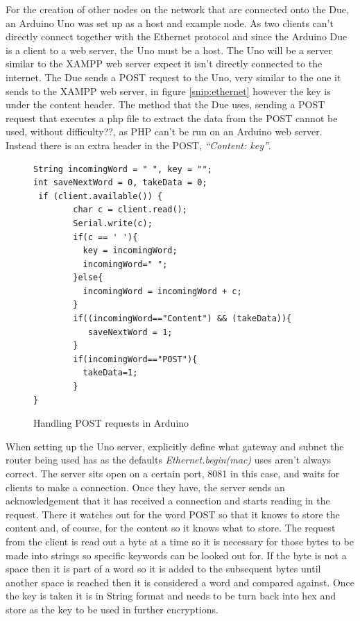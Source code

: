 For the creation of other nodes on the network that are connected onto the Due, an Arduino Uno was set up as a host and example node. As two clients can't directly connect together with the Ethernet protocol and since the Arduino Due is a client to a web server, the Uno must be a host. The Uno will be a server similar to the XAMPP web server expect it isn't directly connected to the internet. 
The Due sends a POST request to the Uno, very similar to the one it sends to the XAMPP web server, in figure \ref{snip:ethernet} however the key is under the content header. The method that the Due uses, sending a POST request that executes a php file to extract the data from the POST cannot be used, without difficulty??, as PHP can't be run on an Arduino web server. Instead there is an extra header in the POST, \emph{``Content: key''}.

\begin{figure}[H]
\begin{lstlisting}[style=Arduino]
String incomingWord = " ", key = "";
int saveNextWord = 0, takeData = 0;
 if (client.available()) {
        char c = client.read();
        Serial.write(c);
        if(c == ' '){
          key = incomingWord;
          incomingWord=" ";
        }else{
          incomingWord = incomingWord + c;
        }
        if((incomingWord=="Content") && (takeData)){
           saveNextWord = 1; 
        }
        if(incomingWord=="POST"){
          takeData=1;
        }
}
\end{lstlisting}
\caption{Handling POST requests in Arduino}
\label{snip:post}
\end{figure}

When setting up the Uno server, explicitly define what gateway and subnet the router being used has as the defaults \emph{Ethernet.begin(mac)} uses aren't always correct. The server sits open on a certain port, 8081 in this case, and waits for clients to make a connection. Once they have, the server sends an acknowledgement that it has received a connection and starts reading in the request. There it watches out for the word POST so that it knows to store the content and, of course, for the content so it knows what to store. The request from the client is read out a byte at a time so it is necessary for those bytes to be made into strings so specific keywords can be looked out for. If the byte is not a space then it is part of a word so it is added to the subsequent bytes until another space is reached then it is considered a word and compared against. Once the key is taken it is in String format and needs to be turn back into hex and store as the key to be used in further encryptions.


